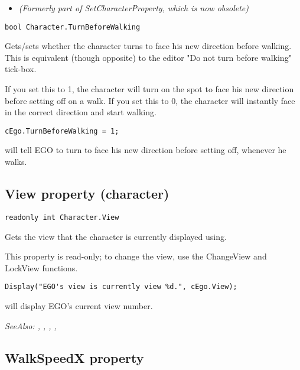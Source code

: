 \begin{itemize}
\item \it{(Formerly part of SetCharacterProperty, which is now obsolete)}
\end{itemize}

\begin{verbatim}
bool Character.TurnBeforeWalking
\end{verbatim}
Gets/sets whether the character turns to face his new direction before walking. This
is equivalent (though opposite) to the editor "Do not turn before walking" tick-box.

If you set this to 1, the character will turn on the spot to face his new direction
before setting off on a walk. If you set this to 0, the character will instantly face
in the correct direction and start walking.

\begin{verbatim}
cEgo.TurnBeforeWalking = 1;
\end{verbatim}
will tell EGO to turn to face his new direction before setting off, whenever he walks.


\subsection{View property (character)}\label{Character.View}%

\begin{verbatim}
readonly int Character.View
\end{verbatim}
Gets the view that the character is currently displayed using.

This property is read-only; to change the view, use the ChangeView and LockView functions.

\begin{verbatim}
Display("EGO's view is currently view %d.", cEgo.View);
\end{verbatim}
will display EGO's current view number.

\it{SeeAlso:} ,
,
,
,


\subsection{WalkSpeedX property}\label{Character.WalkSpeedX}%

